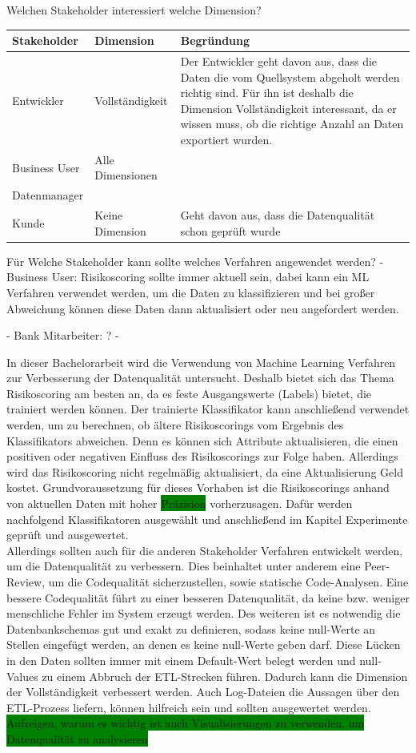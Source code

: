 Welchen Stakeholder interessiert welche Dimension?

\begin{tabular}[h]{l|l|l}
Stakeholder & Dimension & Begründung \\ \hline
Entwickler & Vollständigkeit & Der Entwickler geht davon aus, dass die Daten die vom Quellsystem abgeholt werden richtig sind. Für ihn ist deshalb die Dimension Vollständigkeit interessant, da er wissen muss, ob die richtige Anzahl an Daten exportiert wurden. \\ \hline
Business User & Alle Dimensionen & \\ \hline
Datenmanager & & \\ \hline
Kunde & Keine Dimension & Geht davon aus, dass die Datenqualität schon geprüft wurde \\
\end{tabular}


Für Welche Stakeholder kann sollte welches Verfahren angewendet werden?
- Business User: Risikoscoring sollte immer aktuell sein, dabei kann ein ML Verfahren verwendet werden, um die Daten zu klassifizieren und bei großer Abweichung können diese Daten dann aktualisiert oder neu angefordert werden.

- Bank Mitarbeiter: ?
- 

In dieser Bachelorarbeit wird die Verwendung von Machine Learning Verfahren zur Verbesserung der Datenqualität untersucht.
Deshalb bietet sich das Thema Risikoscoring am besten an, da es feste Ausgangswerte (Labels) bietet, die trainiert werden können.
Der trainierte Klassifikator kann anschließend verwendet werden, um zu berechnen, ob ältere Risikoscorings vom Ergebnis des Klassifikators abweichen.
Denn es können sich Attribute aktualisieren, die einen positiven oder negativen Einfluss des Risikoscorings zur Folge haben. 
Allerdings wird das Risikoscoring nicht regelmäßig aktualisiert, da eine Aktualisierung Geld kostet.
Grundvoraussetzung für dieses Vorhaben ist die Risikoscorings anhand von aktuellen Daten mit hoher \colorbox{green}{Präzision} vorherzusagen. 
Dafür werden nachfolgend Klassifikatoren ausgewählt und anschließend im Kapitel Experimente geprüft und ausgewertet.\\
Allerdings sollten auch für die anderen Stakeholder Verfahren entwickelt werden, um die Datenqualität zu verbessern.
Dies beinhaltet unter anderem eine Peer-Review, um die Codequalität sicherzustellen, sowie statische Code-Analysen.
Eine bessere Codequalität führt zu einer besseren Datenqualität, da keine bzw. weniger menschliche Fehler im System erzeugt werden.
Des weiteren ist es notwendig die Datenbankschemas gut und exakt zu definieren, sodass keine null-Werte an Stellen eingefügt werden, an denen es keine null-Werte geben darf.
Diese Lücken in den Daten sollten immer mit einem Default-Wert belegt werden und null-Values zu einem Abbruch der ETL-Strecken führen.
Dadurch kann die Dimension der Vollständigkeit verbessert werden.
Auch Log-Dateien die Aussagen über den ETL-Prozess liefern, können hilfreich sein und sollten ausgewertet werden.
\colorbox{green}{Aufzeigen, warum es wichtig ist auch Visualisierungen zu verwenden, um Datenqualität zu analysieren}

